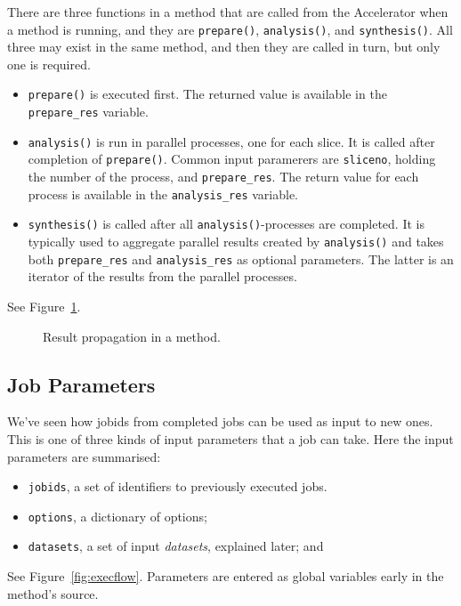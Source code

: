 \documentclass[a4paper]{article}
\begin{document}
There are three functions in a method that are called from the
Accelerator when a method is running, and they are \texttt{prepare()},
\texttt{analysis()}, and \texttt{synthesis()}.  All three may exist in
the same method, and then they are called in turn, but only one is
required.
\begin{itemize}
\item[] \texttt{prepare()} is executed first.  The returned value is
  available in the \texttt{prepare\_res} variable.
\item[] \texttt{analysis()} is run in parallel processes, one for each
  slice.  It is called after completion of \texttt{prepare()}.  Common
  input paramerers are \texttt{sliceno}, holding the number of the
  process, and \texttt{prepare\_res}.  The return value for each
  process is available in the \texttt{analysis\_res} variable.
\item[] \texttt{synthesis()} is called after all
  \texttt{analysis()}-processes are completed.  It is typically used
  to aggregate parallel results created by \texttt{analysis()} and
  takes both \texttt{prepare\_res} and \texttt{analysis\_res} as
  optional parameters.  The latter is an iterator of the results
  from the parallel processes.
\end{itemize}
See Figure~\ref{fig:prepanasyn}.

\begin{figure}[h!]
  \begin{center}
    
    \caption{Result propagation in a method.}
    \label{fig:prepanasyn}
  \end{center}
\end{figure}

\clearpage





\subsection{Job Parameters}


We've seen how jobids from completed jobs can be used as input to new
ones.  This is one of three kinds of input parameters that a job can
take.  Here the input parameters are summarised:
\begin{itemize}
  \item[] \texttt{jobids}, a set of identifiers to previously executed jobs.
  \item[] \texttt{options}, a dictionary of options;
  \item[] \texttt{datasets}, a set of input \textsl{datasets}, explained later; and
\end{itemize}
See Figure~\ref{fig:execflow}.  Parameters are entered as global
variables early in the method's source.
\end{document}
